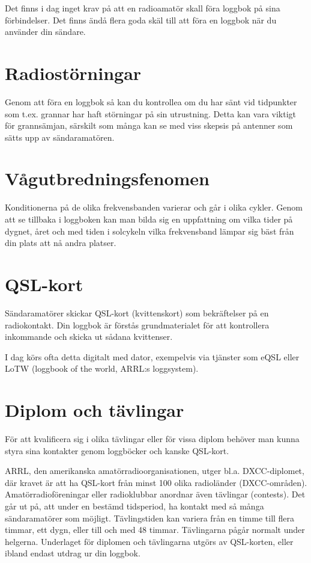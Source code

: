 Det finns i dag inget krav på att en radioamatör skall föra loggbok på sina förbindelser. Det finns ändå flera goda skäl till att föra en loggbok när du använder din sändare. 

\section{Radiostörningar}

Genom att föra en loggbok så kan du kontrollea om du har sänt vid tidpunkter som t.ex. grannar har haft störningar på sin utrustning. Detta kan vara viktigt för grannsämjan, särskilt som många kan se med viss skepsis på antenner som sätts upp av sändaramatören.

\section{Vågutbredningsfenomen}

Konditionerna på de olika frekvensbanden varierar och går i olika cykler. Genom att se tillbaka i loggboken kan man bilda sig en uppfattning om vilka tider på dygnet, året och med tiden i solcykeln vilka frekvensband lämpar sig bäst från din plats att nå andra platser.

\section{QSL-kort}

Sändaramatörer skickar QSL-kort (kvittenskort) som bekräftelser på en radiokontakt. Din loggbok är förstås grundmaterialet för att kontrollera inkommande och skicka ut sådana kvittenser.

I dag körs ofta detta digitalt med dator, exempelvis via tjänster som eQSL eller LoTW (loggbook of the world, ARRL:s loggsystem).

\section{Diplom och tävlingar}

För att kvalificera sig i olika tävlingar eller för vissa diplom behöver man kunna styra sina kontakter genom loggböcker och kanske QSL-kort. 

ARRL, den amerikanska amatörradioorganisationen, utger bl.a. DXCC-diplomet,
där kravet är att ha QSL-kort från minst 100 olika radioländer (DXCC-områden).
Amatörradioföreningar eller radioklubbar anordnar även tävlingar (contests). Det går
ut på, att under en bestämd tidsperiod, ha kontakt med så många sändaramatörer som
möjligt. Tävlingstiden kan variera från en timme till flera timmar, ett dygn, eller till och med 48 timmar. Tävlingarna pågår normalt under helgerna. Underlaget för diplomen och tävlingarna utgörs av QSL-korten, eller ibland endast utdrag ur din loggbok.

